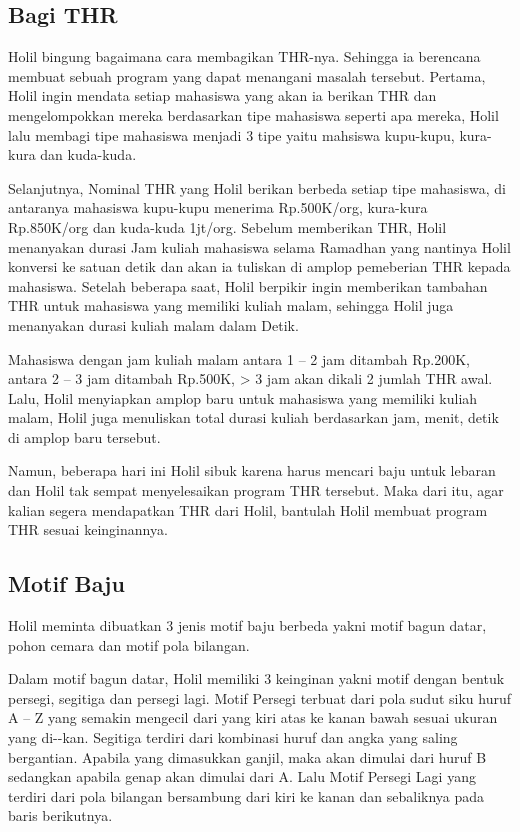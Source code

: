 \documentclass[../main.tex]{subfiles}
\begin{document}
    \subsection{Bagi THR}
    Holil bingung bagaimana cara membagikan THR-nya. Sehingga ia berencana membuat sebuah program yang dapat menangani masalah tersebut. Pertama, Holil ingin mendata setiap mahasiswa yang akan ia berikan THR dan mengelompokkan mereka berdasarkan tipe mahasiswa seperti apa mereka, Holil lalu membagi tipe mahasiswa menjadi 3 tipe yaitu mahsiswa kupu-kupu, kura-kura dan kuda-kuda.

    Selanjutnya, Nominal THR yang Holil berikan berbeda setiap tipe mahasiswa, di antaranya mahasiswa kupu-kupu menerima Rp.500K/org, kura-kura Rp.850K/org dan kuda-kuda 1jt/org. Sebelum memberikan THR, Holil menanyakan durasi Jam kuliah mahasiswa selama Ramadhan yang nantinya Holil konversi ke satuan detik dan akan ia tuliskan di amplop pemeberian THR kepada mahasiswa. Setelah beberapa saat, Holil berpikir ingin memberikan tambahan THR untuk mahasiswa yang memiliki kuliah malam, sehingga Holil juga menanyakan durasi kuliah malam dalam Detik.

    Mahasiswa dengan jam kuliah malam antara 1 – 2 jam ditambah Rp.200K, antara 2 – 3 jam ditambah Rp.500K, > 3 jam akan dikali 2 jumlah THR awal. Lalu, Holil menyiapkan amplop baru untuk mahasiswa yang memiliki kuliah malam, Holil juga menuliskan total durasi kuliah berdasarkan jam, menit, detik di amplop baru tersebut.

    Namun, beberapa hari ini Holil sibuk karena harus mencari baju untuk lebaran dan Holil tak sempat menyelesaikan program THR tersebut. Maka dari itu, agar kalian segera mendapatkan THR dari Holil, bantulah Holil membuat program THR sesuai keinginannya.
    \subsection{Motif Baju}
    Holil meminta dibuatkan 3 jenis motif baju berbeda yakni motif bagun datar, pohon cemara dan motif pola bilangan.

    Dalam motif bagun datar, Holil memiliki 3 keinginan yakni motif dengan bentuk persegi, segitiga dan persegi lagi. Motif Persegi terbuat dari pola sudut siku huruf A – Z yang semakin mengecil dari yang kiri atas ke kanan bawah sesuai ukuran yang di-{\ioi}-kan. Segitiga terdiri dari kombinasi huruf dan angka yang saling bergantian. Apabila {\ioi} yang dimasukkan ganjil, maka akan dimulai dari huruf B sedangkan apabila {\ioi} genap akan dimulai dari A. Lalu Motif Persegi Lagi yang terdiri dari pola bilangan bersambung dari kiri ke kanan dan sebaliknya pada baris berikutnya.
\end{document}
